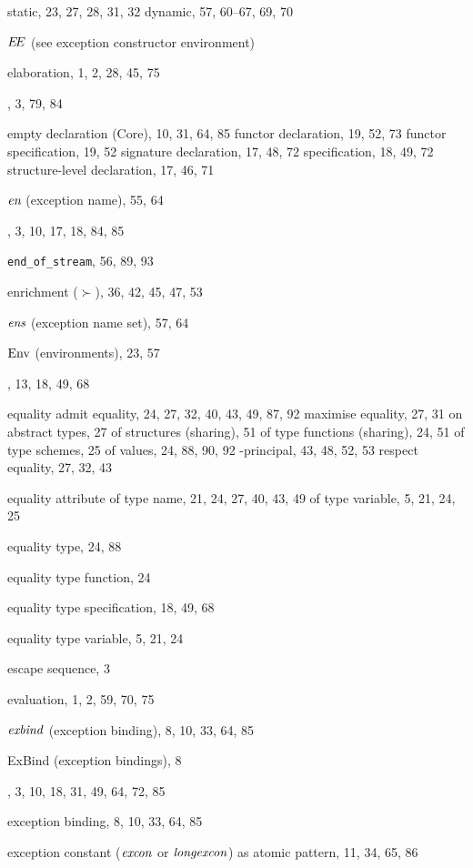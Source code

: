 \begin{theindex}
\subitem static, 23, 27, 28, 31, 32
\subitem dynamic, 57, 60--67, 69, 70
\item $\mbox{$E\!E$}$ (see exception constructor environment) 
\item elaboration, 1, 2, 28, 45, 75
\item \ELSE, 3, 79, 84
\item empty 
\subitem declaration (Core), 10, 31, 64, 85
\subitem functor declaration, 19, 52, 73
\subitem functor specification, 19, 52
\subitem signature declaration, 17, 48, 72
\subitem specification, 18, 49, 72
\subitem structure-level declaration, 17, 46, 71
\item $\mbox{\it en}$ (exception name), 55, 64
\item \END, 3, 10, 17, 18, 84, 85
\item \verb+end_of_stream+, 56, 89, 93
\item enrichment ($\succ$), 36, 42, 45, 47, 53
\item $\mbox{\it ens}$ (exception name set), 57, 64
\item ${\rm Env}$ (environments), 23, 57
\item \EQTYPE, 13, 18, 49, 68
\item equality 
\subitem admit equality, 24, 27, 32, 40, 43, 49, 87, 92
\subitem maximise equality, 27, 31
\subitem on abstract types, 27
\subitem of structures (sharing), 51
\subitem of type functions (sharing), 24, 51
\subitem of type schemes, 25
\subitem of values, 24, 88, 90, 92
\subitem -principal, 43, 48, 52, 53
\subitem respect equality, 27, 32, 43
\item equality attribute 
\subitem of type name, 21, 24, 27, 40, 43, 49
\subitem of type variable, 5, 21, 24, 25
\item equality type, 24, 88
\item equality type function, 24
\item equality type specification, 18, 49, 68
\item equality type variable, 5, 21, 24
\item escape sequence, 3
\item evaluation, 1, 2, 59, 70, 75
\item ${\it exbind}$ (exception binding), 8, 10, 33, 64, 85
\item ExBind (exception bindings), 8
\item \EXCEPTION, 3, 10, 18, 31, 49, 64, 72, 85
\item exception binding, 8, 10, 33, 64, 85
\item exception constant (${\it excon}$ or ${\it longexcon}$) 
\subitem as atomic pattern, 11, 34, 65, 86

\end{theindex}
